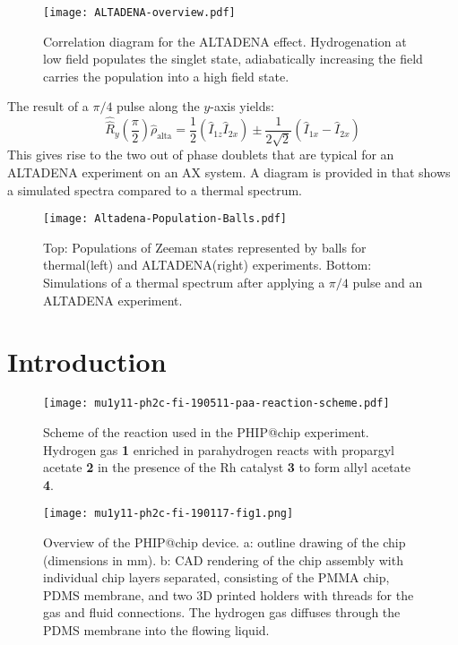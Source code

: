  \begin{figure}
   \begin{center}
   \texttt{[image: ALTADENA-overview.pdf]}
   \end{center}
   \caption{Correlation diagram for the ALTADENA effect. Hydrogenation at low field populates the singlet state, adiabatically increasing
   the field carries the population into a high field state.}
   \label{fig:SingletTriplet}
 \end{figure}

 The result of a $\pi/4$ pulse along the $y$-axis yields:
 \begin{equation}
   \hat{\hat{R}}_y(\frac{\pi}{2})\hat{\rho}_{\text{alta}} = \frac{1}{2}(\hat{I}_{1z}\hat{I}_{2x})±\frac{1}{2\sqrt{2}}(\hat{I}_{1x}-\hat{I}_{2x})
 \end{equation}
 This gives rise to the two out of phase doublets that are typical for an ALTADENA experiment on an AX system. A diagram
 is provided in  that shows a simulated spectra compared to a thermal spectrum.

 \begin{figure}
   \begin{center}
   \texttt{[image: Altadena-Population-Balls.pdf]}
   \end{center}
   \caption{Top: Populations of Zeeman states represented by balls for thermal(left) and ALTADENA(right) experiments.
   Bottom: Simulations of a thermal spectrum after applying a $\pi/4$ pulse and an ALTADENA experiment.}
   \label{fig:ALTADENA}
 \end{figure}



\section{Introduction}

\begin{figure*}
  \centering
  \texttt{[image: mu1y11-ph2c-fi-190511-paa-reaction-scheme.pdf]}
  \caption{
    Scheme of the reaction used in the PHIP@chip experiment. Hydrogen gas
    \textbf{1}
    enriched in parahydrogen reacts with propargyl acetate \textbf{2} in
    the presence of the Rh catalyst \textbf{3} to form allyl acetate \textbf{4}.
  }
  \label{fig:reaction-scheme}
\end{figure*}

\begin{figure}
	\centering
	\texttt{[image: mu1y11-ph2c-fi-190117-fig1.png]}
	\caption{Overview of the PHIP@chip device.
    a: outline drawing of the chip (dimensions in mm).
		b: CAD rendering of the chip assembly with individual chip layers
		separated, consisting of the PMMA chip, PDMS membrane, and two 3D
		printed holders with threads for the gas and fluid connections.
    The hydrogen gas
		diffuses through the PDMS membrane into the flowing liquid.
		}
	\label{fig:phip@chip1}
\end{figure}

